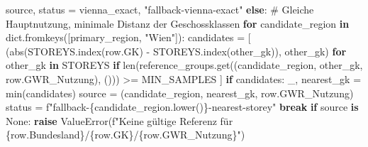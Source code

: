 \documentclass[
  ngerman,
  a4paper,
  DIV=11]{scrreprt}
\newenvironment{Shaded}{\begin{snugshade}}{\end{snugshade}}
\newcommand{\BuiltInTok}[1]{\textcolor[rgb]{0.00,0.23,0.31}{#1}}
\newcommand{\CommentTok}[1]{\textcolor[rgb]{0.37,0.37,0.37}{#1}}
\newcommand{\ControlFlowTok}[1]{\textcolor[rgb]{0.00,0.23,0.31}{\textbf{#1}}}
\newcommand{\KeywordTok}[1]{\textcolor[rgb]{0.00,0.23,0.31}{\textbf{#1}}}
\newcommand{\NormalTok}[1]{\textcolor[rgb]{0.00,0.23,0.31}{#1}}
\newcommand{\OperatorTok}[1]{\textcolor[rgb]{0.37,0.37,0.37}{#1}}
\newcommand{\PreprocessorTok}[1]{\textcolor[rgb]{0.68,0.00,0.00}{#1}}
\newcommand{\SpecialCharTok}[1]{\textcolor[rgb]{0.37,0.37,0.37}{#1}}
\newcommand{\SpecialStringTok}[1]{\textcolor[rgb]{0.13,0.47,0.30}{#1}}
\newcommand{\StringTok}[1]{\textcolor[rgb]{0.13,0.47,0.30}{#1}}
\newcommand{\VariableTok}[1]{\textcolor[rgb]{0.07,0.07,0.07}{#1}}
\begin{document}
\begin{Shaded}
\begin{Highlighting}[]
\NormalTok{            source, status }\OperatorTok{=}\NormalTok{ vienna\_exact, }\StringTok{"fallback{-}vienna{-}exact"}
        \ControlFlowTok{else}\NormalTok{:}
            \CommentTok{\# Gleiche Hauptnutzung, minimale Distanz der Geschossklassen}
            \ControlFlowTok{for}\NormalTok{ candidate\_region }\KeywordTok{in} \BuiltInTok{dict}\NormalTok{.fromkeys([primary\_region, }\StringTok{"Wien"}\NormalTok{]):}
\NormalTok{                candidates }\OperatorTok{=}\NormalTok{ [}
\NormalTok{                    (}\BuiltInTok{abs}\NormalTok{(STOREYS.index(row.GK) }\OperatorTok{{-}}\NormalTok{ STOREYS.index(other\_gk)), other\_gk)}
                    \ControlFlowTok{for}\NormalTok{ other\_gk }\KeywordTok{in}\NormalTok{ STOREYS}
                    \ControlFlowTok{if} \BuiltInTok{len}\NormalTok{(reference\_groups.get((candidate\_region, other\_gk, row.GWR\_Nutzung), ())) }\OperatorTok{\textgreater{}=}\NormalTok{ MIN\_SAMPLES}
\NormalTok{                ]}
                \ControlFlowTok{if}\NormalTok{ candidates:}
\NormalTok{                    \_, nearest\_gk }\OperatorTok{=} \BuiltInTok{min}\NormalTok{(candidates)}
\NormalTok{                    source }\OperatorTok{=}\NormalTok{ (candidate\_region, nearest\_gk, row.GWR\_Nutzung)}
\NormalTok{                    status }\OperatorTok{=} \SpecialStringTok{f"fallback{-}}\SpecialCharTok{\{}\NormalTok{candidate\_region}\SpecialCharTok{.}\NormalTok{lower()}\SpecialCharTok{\}}\SpecialStringTok{{-}nearest{-}storey"}
                    \ControlFlowTok{break}
        \ControlFlowTok{if}\NormalTok{ source }\KeywordTok{is} \VariableTok{None}\NormalTok{:}
            \ControlFlowTok{raise} \PreprocessorTok{ValueError}\NormalTok{(}\SpecialStringTok{f"Keine gültige Referenz für }\SpecialCharTok{\{}\NormalTok{row}\SpecialCharTok{.}\NormalTok{Bundesland}\SpecialCharTok{\}}\SpecialStringTok{/}\SpecialCharTok{\{}\NormalTok{row}\SpecialCharTok{.}\NormalTok{GK}\SpecialCharTok{\}}\SpecialStringTok{/}\SpecialCharTok{\{}\NormalTok{row}\SpecialCharTok{.}\NormalTok{GWR\_Nutzung}\SpecialCharTok{\}}\SpecialStringTok{"}\NormalTok{)}


\end{Highlighting}
\end{Shaded}
\end{document}
